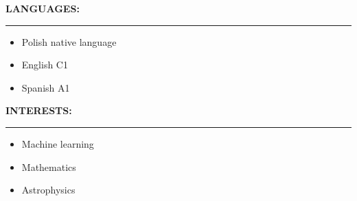 \documentclass[10pt]{article}
\newcommand{\longline}{\rule{19.6cm}{1pt}}
\begin{document}
\noindent \fontsize{14pt}{14pt}\selectfont \textbf{\color{Violet}LANGUAGES:}
\fontsize{10pt}{10pt}\selectfont
\\
\noindent \longline 
\begin{itemize}[leftmargin=*]
    \item Polish native language
    \item English C1
    \item Spanish A1
\end{itemize}

\noindent \fontsize{14pt}{14pt}\selectfont \textbf{\color{Violet}INTERESTS:}
\fontsize{10pt}{10pt}\selectfont
\\
\noindent \longline 
\begin{itemize}[leftmargin=*]
    \item Machine learning
    \item Mathematics
    \item Astrophysics
\end{itemize}
\end{document}

